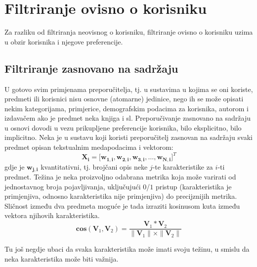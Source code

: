 \documentclass[times, utf8, diplomski, numeric]{fer}
\begin{document}
\section{Filtriranje ovisno o korisniku}
Za razliku od filtriranja neovisnog o korisniku, filtriranje ovisno o korisniku
uzima u obzir korisnika i njegove preferencije.
\subsection{Filtriranje zasnovano na sadržaju}
U gotovo svim primjenama preporučitelja, tj. u sustavima u kojima se oni
koriste, predmeti ili korisnici nisu osnovne (atomarne) jedinice, nego ih se
može opisati nekim kategorijama, primjerice, demografskim podacima za korisnika,
autorom i izdavačem ako je predmet neka knjiga i sl. Preporučivanje zasnovano
na sadržaju u osnovi dovodi u vezu prikupljene preferencije korisnika, bilo
eksplicitno, bilo implicitno. Neka je u sustavu koji koristi preporučitelj
zasnovan na sadržaju svaki predmet opisan tekstualnim medapodacima i vektorom:
\begin{equation}
\label{eq:vektorKarakteristika}
	\boldsymbol{X_i} = 
		\big[ 
			\boldsymbol{w_{1,i}}, 
			\boldsymbol{w_{2,i}}, 
			\boldsymbol{w_{3,i}}, 
			\ldots, 
			\boldsymbol{w_{N,i}} 
		\big]^T
\end{equation}
gdje je $\boldsymbol{w_{j,i}}$ kvantitativni, tj. brojčani opis neke $j$-te
karakteristike za $i$-ti predmet. Težina je neka proizvoljno odabrana metrika
koja može varirati od jednostavnog broja pojavljivanja, uključujući $0$/$1$
pristup (karakteristika je primjenjiva, odnosno karakteristika nije
primjenjiva) do precijznijih metrika. Sličnost između dva predmeta moguće je
tada izraziti kosinusom kuta između vektora njihovih karakteristika. 
\begin{equation}
\label{eq:kosinus}
	\boldsymbol{cos}(\boldsymbol{V}_1, \boldsymbol{V}_2) = 
		\frac
			{\boldsymbol{V}_1 \ast \boldsymbol{V}_2}
			{\|\boldsymbol{V}_1\| \times \|\boldsymbol{V}_2\|}
\end{equation}

Tu još negdje ubaci da svaka karakteristika može imati svoju težinu, u smislu da
neka karakteristika može biti važnija.
\end{document}
